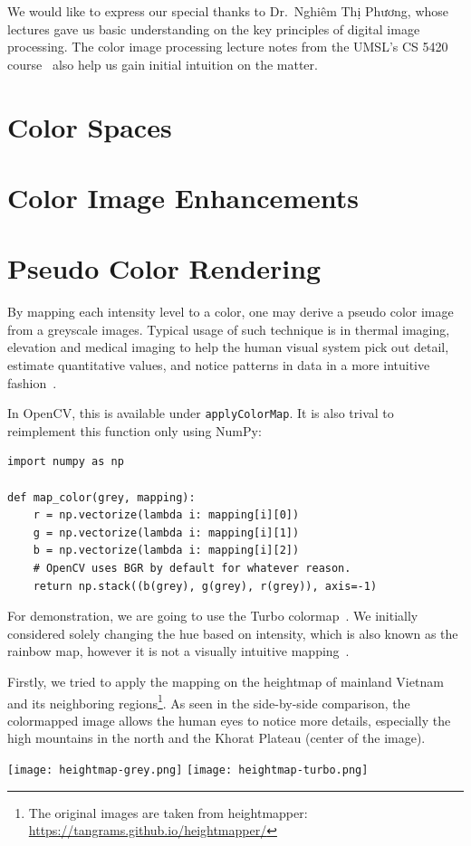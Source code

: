 \documentclass[a4paper,12pt]{article}
\begin{document}
We would like to express our special thanks to Dr.~Nghiêm Thị Phương,
whose lectures gave us basic understanding on the key principles of
digital image processing.  The color image processing lecture notes from
the UMSL's CS 5420 course~\cite{cs5420} also help us gain initial intuition
on the matter.

\newpage
{}
\section{Color Spaces}

\section{Color Image Enhancements}

\section{Pseudo Color Rendering}
By mapping each intensity level to a color, one may derive a pseudo color image
from a greyscale images.  Typical usage of such technique is in thermal imaging,
elevation and medical imaging to help the human visual system pick out detail,
estimate quantitative values, and notice patterns in data in a more intuitive
fashion~\cite{turbo}.

In OpenCV, this is available under \verb|applyColorMap|.  It is also trival
to reimplement this function only using NumPy:
\begin{verbatim}
import numpy as np

def map_color(grey, mapping):
    r = np.vectorize(lambda i: mapping[i][0])
    g = np.vectorize(lambda i: mapping[i][1])
    b = np.vectorize(lambda i: mapping[i][2])
    # OpenCV uses BGR by default for whatever reason.
    return np.stack((b(grey), g(grey), r(grey)), axis=-1)
\end{verbatim}

For demonstration, we are going to use the Turbo colormap~\cite{turbo}.
We initially considered solely changing the hue based on intensity,
which is also known as the rainbow map, however it is not a visually
intuitive mapping~\cite{rainbowbad}.

Firstly, we tried to apply the mapping on the heightmap of mainland Vietnam and
its neighboring regions\footnote{The original images are taken from
heightmapper: \url{https://tangrams.github.io/heightmapper/}}.  As seen in
the side-by-side comparison, the colormapped image allows the human eyes
to notice more details, especially the high mountains in the north and
the Khorat Plateau (center of the image).
\begin{center}
  \texttt{[image: heightmap-grey.png]}
  \texttt{[image: heightmap-turbo.png]}
\end{center}
\end{document}
